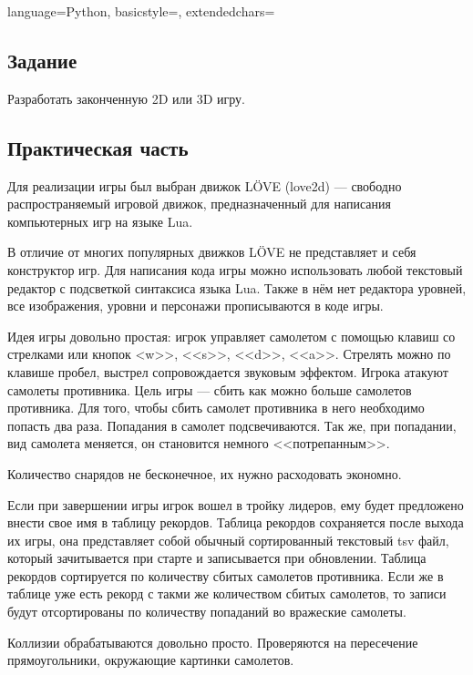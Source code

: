 \documentclass[12pt]{article}
\begin{document}

\lstset
{
        language=Python,
        basicstyle=\footnotesize,%
        extendedchars=\true
}

\subsection*{Задание}

Разработать законченную 2D или 3D игру.

\subsection*{Практическая часть}
Для реализации игры был выбран движок LÖVE (love2d) --- свободно распространяемый игровой движок,
предназначенный для написания компьютерных игр на языке Lua.

В отличие от многих популярных движков LÖVE не представляет и себя конструктор игр.
Для написания кода игры можно использовать любой текстовый редактор с подсветкой синтаксиса языка Lua.
Также в нём нет редактора уровней, все изображения, уровни и персонажи прописываются в коде игры.~\cite{love}

Идея игры довольно простая: игрок управляет самолетом с помощью клавиш со стрелками или кнопок
<w>>, <<s>>, <<d>>, <<a>>. Стрелять можно по клавише пробел, выстрел сопровождается звуковым эффектом.
Игрока атакуют самолеты противника. Цель игры --- сбить как можно больше
самолетов противника. Для того, чтобы сбить самолет противника в него необходимо попасть два раза.
Попадания в самолет подсвечиваются. Так же, при попадании, вид самолета меняется, он становится
немного <<потрепанным>>.

Количество снарядов не бесконечное, их нужно расходовать экономно.

Если при завершении игры игрок вошел в тройку лидеров, ему будет предложено внести свое
имя в таблицу рекордов.
Таблица рекордов сохраняется после выхода их игры, она представляет собой обычный
сортированный текстовый tsv файл, который зачитывается при старте и записывается при
обновлении. Таблица рекордов сортируется по количеству сбитых самолетов противника.
Если же в таблице уже есть рекорд с такми же количеством сбитых самолетов, то записи
будут отсортированы по количеству попаданий во вражеские самолеты.

Коллизии обрабатываются довольно просто. Проверяются на пересечение прямоугольники,
окружающие картинки самолетов.
\end{document}

